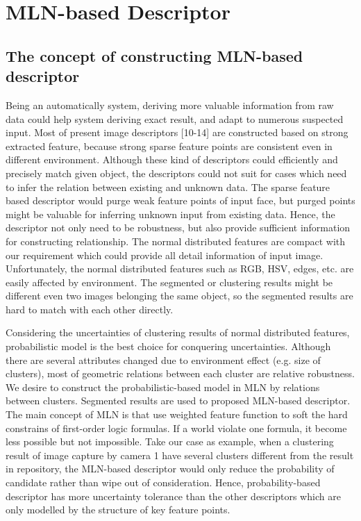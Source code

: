 \documentclass[journal]{IEEEtran}
\begin{document}
\section{MLN-based Descriptor}
\subsection{The concept of constructing MLN-based descriptor}
Being an automatically system, deriving more valuable information from raw data could help system deriving exact result, and adapt to numerous suspected input. Most of present image descriptors [10-14] are constructed based on strong extracted feature, because strong sparse feature points are consistent even in different environment. Although these kind of descriptors could efficiently and precisely match given object, the descriptors could not suit for cases which need to infer the relation between existing and unknown data. The sparse feature based descriptor would purge weak feature points of input face, but purged points might be valuable for inferring unknown input from existing data. Hence, the descriptor not only need to be robustness, but also provide sufficient information for constructing relationship. The normal distributed features are compact with our requirement which could provide all detail information of input image. Unfortunately, the normal distributed features such as  RGB, HSV, edges, etc. are easily affected by environment. The segmented or clustering results might be different even two images belonging the same object, so the segmented results are hard to match with each other directly. 

Considering the uncertainties of clustering results of normal distributed features, probabilistic model is the best choice for conquering uncertainties. Although there are several attributes changed due to environment effect (e.g. size of clusters), most of geometric relations between each cluster are relative robustness. We desire to construct the probabilistic-based model in MLN by relations between clusters. Segmented results are used to proposed MLN-based descriptor. The main concept of MLN is that use weighted feature function to soft the hard constrains of first-order logic formulas. If a world violate one formula, it become less possible but not impossible. Take our case as example, when a clustering result of image capture by camera 1 have several clusters different from the result in repository, the MLN-based descriptor would only reduce the probability of candidate rather than wipe out of consideration. Hence, probability-based descriptor has more uncertainty tolerance than the other descriptors which are only modelled by the structure of key feature points. 
\end{document}
